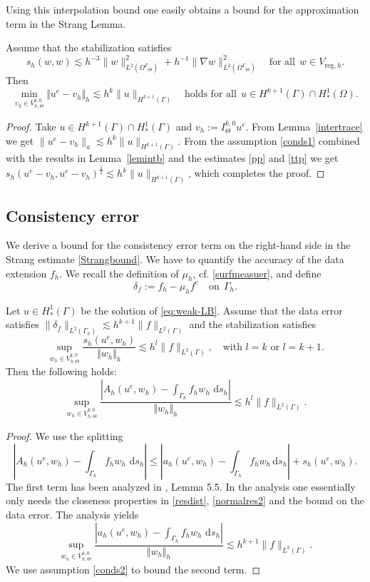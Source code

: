 \documentclass[final]{siamltex}
\begin{document}
Using this interpolation bound one easily obtains a bound for the approximation term in the Strang Lemma.
\begin{lemma} Assume that the stabilization satisfies
\begin{equation} \label{conds1}
 s_h(w,w) \lesssim h^{-3}\|w\|_{L^2({\Omega^{\Gamma}}_\Theta)}^2 + h^{-1} \|\nabla w\|_{L^2({\Omega^{\Gamma}}_\Theta)}^2 \quad \text{for all} ~~w \in {V_{\text{reg},h}}.
\end{equation}
Then 
\[
  \min_{v_h \in {V_{h,\Theta}^{k,0}}} {\Vert {u^e - v_h} \Vert_h} \lesssim h^k \|u\|_{H^{k+1}(\Gamma)} \quad \text{holds for all}~~u \in H^{k+1}(\Gamma) \cap H_\ast^1(\Omega).
\]
\end{lemma}
\begin{proof} 
 Take $u \in H^{k+1}(\Gamma)\cap H_\ast^1(\Gamma)$ and $v_h:= {I_{\Theta}^{k,0}} u^e$. From Lemma~\ref{intertrace} we get $\|u^e-v_h\|_a \lesssim h^k \|u\|_{H^{k+1}(\Gamma)} $.
 From the assumption \eqref{conds1} combined with the results in
  Lemma~\ref{lemintb}
and the estimates \eqref{pp} and \eqref{ttp} we get $s_h(u^e-v_h,u^e-v_h)^\frac12 \lesssim h^k \|u\|_{H^{k+1}(\Gamma)}$, which completes the proof.
\end{proof}

\subsection{Consistency error}
We derive a bound for the consistency error term on the right-hand side in the Strang estimate \eqref{Strangbound}. We have to quantify the accuracy of the data extension $f_h$. 
We recall the definition of $\mu_h$, cf. \eqref{surfmeasuer}, and define
\[
  \delta_f:=f_h- \mu_h f^e \quad \text{on}~~\Gamma_h.
\]
 \begin{lemma} \label{lem:conserr}
Let $u \in H_\ast^1(\Gamma)$ be the solution of \eqref{eq:weak-LB}. Assume that the data error satisfies $\|\delta_f\|_{L^2(\Gamma_h)} \lesssim h^{k+1} \|f\|_{L^2(\Gamma)}$ and the stabilization satisfies
\begin{equation} \label{conds2}
 \sup_{w_h \in {V_{h,\Theta}^{k,0}}} \frac{s_h(u^e,w_h)}{{\Vert {w_h} \Vert_h}} \lesssim h^{l}\|f\|_{L^2(\Gamma)}, \quad \text{with $l=k$ or $l=k+1$}.
\end{equation}
 Then the following holds:
\[ \sup_{w_h \in {V_{h,\Theta}^{k,0}}} \frac{|A_h(u^e,w_h)-\int_{\Gamma_h} f_h w_h \, {\,\mathrm{d} {s_h}}|}{{\Vert {w_h} \Vert_h}} \lesssim h^{l}\|f\|_{L^2(\Gamma)}.
\]
\end{lemma}
\begin{proof}
 We use the splitting
\[
   |A_h(u^e,w_h)-\int_{\Gamma_h} f_h w_h \, {\,\mathrm{d} {s_h}}| \leq |a_h(u^e,w_h)-\int_{\Gamma_h} f_h w_h {\,\mathrm{d} {s_h}}| + s_h(u^e,w_h).
\]
The first term has been analyzed in \cite{reusken2015}, Lemma 5.5. In the analysis one essentially only needs the closeness properties in \eqref{resdist}, \eqref{normalres2} and the bound on the data error.
The analysis yields
\[
  \sup_{w_h \in {V_{h,\Theta}^{k,0}}} \frac{|a_h(u^e,w_h)-\int_{\Gamma_h} f_h w_h \, {\,\mathrm{d} {s_h}}|}{{\Vert {w_h} \Vert_h}} \lesssim h^{k+1}\|f\|_{L^2(\Gamma)}.
\]
We use assumption \eqref{conds2} to bound the second term.
\end{proof}
\end{document}
